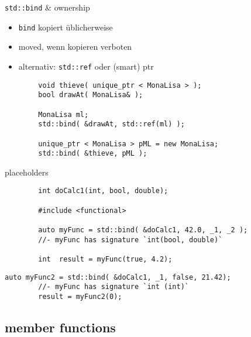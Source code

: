 \begin{frame}[fragile]{ \texttt{std::bind} \& ownership }
	\begin{itemize}
		\item \texttt{bind} kopiert üblicherweise
		\item moved, wenn kopieren verboten
		\item alternativ: \texttt{std::ref} oder (smart) ptr
	\end{itemize}
	
	\pause
	
	\begin{lstlisting}
		void thieve( unique_ptr < MonaLisa > );
		bool drawAt( MonaLisa& );
		
		MonaLisa ml;
		std::bind( &drawAt, std::ref(ml) );
		
		unique_ptr < MonaLisa > pML = new MonaLisa;
		std::bind( &thieve, pML );
	\end{lstlisting}
\end{frame}

\begin{frame}[fragile]{ placeholders }
	\begin{lstlisting}
		int doCalc1(int, bool, double);
		
		#include <functional>
		
		auto myFunc = std::bind( &doCalc1, 42.0, _1, _2 );
		//- myFunc has signature `int(bool, double)`
		
		int  result = myFunc(true, 4.2);
	\end{lstlisting}
	
	\pause
	
	\begin{lstlisting}[firstnumber=9]
		auto myFunc2 = std::bind( &doCalc1, _1, false, 21.42);
		//- myFunc has signature `int (int)`
		result = myFunc2(0);
	\end{lstlisting}
\end{frame}


\subsection{ member functions }

